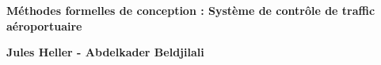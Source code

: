 
\begin{titlepage}
	\parindent=0pt
 
\addtolength{\wpXoffset}{-4.5cm}

	
	\hrulefill
	\begin{center}\bfseries\Huge
		\color{white}
		{Méthodes formelles de conception : Système de contrôle de traffic aéroportuaire} 
	\end{center}
	\hrulefill
	
	\vspace*{1cm}
	\begin{center}\bfseries\Large
			\color{white}
		{Jules Heller - Abdelkader Beldjilali}
		
	\end{center}
	


\end{titlepage}